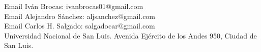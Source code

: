 \begin{contact}
Email Iván Brocas: ivanbrocas01@gmail.com\\
Email Alejandro Sánchez: aljsanchez@gmail.com\\
Email Carlos H. Salgado: salgadocar@gmail.com\\
Universidad Nacional de San Luis. Avenida Ejército de los Andes 950, Ciudad de San Luis.
\end{contact}
